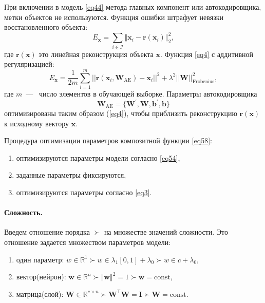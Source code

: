 \documentclass[12pt, twoside]{article}
\newcommand{\xb}{{\mathbf{x}}}
\newenvironment{comment}{}{}
\newcommand{\x}{{\mathbf{x}}}
\newcommand{\wvec}{{\mathbf{W}}}
\newcommand{\w}{{\mathbf{W}}}
\newcommand{\wm}{{\mathbf{w}}}
\begin{document}
\begin{comment}
При включении в модель \eqref{eq44} метода главных компонент или автокодировщика, метки объектов не используются. Функция ошибки штрафует невязки восстановленного объекта:
\begin{equation}\label{eq4}
E_\mathbf{x} = \sum_{i\in\mathcal{I}}\left\Vert{\xb_i-\mathbf{r}(\xb_i)}\right\Vert_2^2,
\end{equation}
где $\mathbf{r}(\x)$  это линейная реконструкция объекта $\x$. Функция \eqref{eq4} с аддитивной регуляризацией:
\begin{equation}\label{eq54}
E_\mathbf{x} = \frac{1}{2m}\sum\limits_{i=1}^m||\mathbf{r}(\textbf{x}_i,\textbf{W}_{\text{AE}}) - \x_i||^2 + \lambda^2||\w||_\text{Frobenius}^2,
\end{equation}
где $m$~---~ число элементов в обучающей выборке.
Параметры автокодировщика
\begin{equation}
\textbf{W}_{\text{AE}} = \{\w^{'},\w,\mathbf{b}^{'},\mathbf{b}\}
\end{equation}
оптимизированы таким образом (\ref{eq4}), чтобы приблизить реконструкцию $\mathbf{r}(\x)$ к исходному вектору $\x$.

Процедура оптимизации параметров композитной функции \eqref{eq58}:

\begin{enumerate}
\item[1)]
оптимизируются параметры модели согласно \eqref{eq54},
\item[2)]
заданные параметры фиксируются,
\item[3)]
оптимизируются параметры согласно \eqref{eq3}.
\end{enumerate}

\paragraph{Сложность.}
Введем отношение порядка $\succ$ на множестве значений сложности. Это отношение задается множеством параметров модели:
\begin{enumerate}
\item[1)] один параметр: $w\in \mathbb{R}^1 \succ w \in \lambda_1 [0,1] +\lambda_0 \succ w\in c +\lambda_0$,
\item[2)] вектор(нейрон): $\wm\in \mathbb{R}^n \succ \left\Vert \wm \right\Vert^2 =1 \succ \wm= \text{const}$,
\item[3)] матрица(слой): $\wvec\in \mathbb{R}^{c{\times}n} \succ \wvec^\mathsf{T}\wvec = \mathbf{I} \succ \wvec= \text{const}$.
\end{enumerate}


\end{comment}
\end{document}
